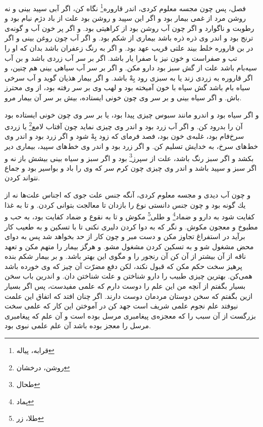 فصل، پس چون مجسه معلوم كردى، اندر قاروره\footnote{قرابه، پیاله} نگاه كن، اگر آبى سپيد بينى و نه روشن مرد از غمى بيمار بود و اگر اين سپيد و روشن بود علت از باد دژم نبام بود و رطوبت و ناگوارد و اگر چون آب روشن بود از كراهيتى بود. و اگر پر خون آب و گونه‌ی ترنج بود و اندر وى ذره ذره باشد بيمارى از شكم بود. و اگر آب چون روغن بينى و اگر در بن قاروره خلط بيند علتى قريب عهد بود. و اگر به رنگ زعفران باشد بدان كه او را تب و صفراست و خون نيز با صفرا يار باشد. اگر بر سر آب زردى باشد و بن آب سيه‌بام باشد علت از گش سبز بود دارو مكن. و اگر بر سر آب سياهى بينى هم چنين، و اگر قاروره به زردى زند يا به سبزى رود بِهْ باشد. و اگر بيمار هذيان گويد و آب سرخى سياه بام باشد گش سپاه با خون آميخته بود و لهب وى بر سر رفته بود، از وى محترز باش. و اگر سياه بينى و بر سر وى چون خونى ايستاده، بيش بر سر آن بيمار مرو.

و اگر سياه بود و اندرو مانند سبوس چيزى پيدا بود، يا بر سر وى چون خونى ايستاده بود آن را بدرود كن. و اگر آب زرد بود و اندر وى چيزى نمايد چون آفتاب لامع\footnote{روشن، درخشان} يا زردى سرخ‌فام بود، غلبه‌ی خون بود، فصد فرماى كه زود بِهْ شود و اگر زرد بود و اندر وى خط‌هاى سرخ، به خدايش تسليم كن. و اگر زرد بود و اندر وى خط‌هاى سپيد، بيمارى دير بكشد و اگر سبز رنگ باشد، علت از سپرز\footnote{طحال} بود و اگر سبز و سياه بينى بيشش باز نه و اگر سبز و سپيد باشد و اندر وى چيزى چون كرم سر كه وى را باد و بواسير بود و جماع نتواند كردن.

و چون آب ديدى و مجسه معلوم كردى، آنگه جنس علت جوى كه اجناس علت‌ها نه از يك گونه بود و چون جنس دانستى نوع را بازدان تا معالجت بتوانى كردن. و تا به غذا كفايت شود به دارو و ضماد\footnote{پماد} و طلى\footnote{طلا، زر} مكوش و تا به نقوع و ضماد كفايت بود، به حب و مطبوخ و معجون مكوش. و نگر كه به دوا كردن دليرى نكنى تا با تسكين و به طعيب كار برآيد در استفراغ تجاوز مكن و دست مبر و چون كار از حد بخواهد شد پس به دواى محض مشغول شو و به تسكين كردن مشغول مشو. و هرگز بيمار را متهم مكن و تعهد ناقه از آن بيشتر از آن كن آن رنجور را و مگوى اين بهتر باشد. و بر بيمار شكم بنده پرهيز سخت حكم مكن كه قبول نكند، لكن دفع مضرّت آن چيز كه وى خورده باشد همى‌كن. بهترين چيزى طبيب را دارو شناختن و علت شناختن دان. و اندرين باب سخن بسيار بگفتم از آنچه من اين علم را دوست دارم كه علمى مفيدست، پس اگر بسيار ازين بگفتم كه سخن دوستان مردمان دوست دارند. اگر چنان افتد كه اتفاق اين علمت نيوفتد علم نجوم علمى شريف است جهد كن در آموختن اين كار كه علمى سخت بزرگست از آن سبب را كه معجزه‌ی پيغامبرى مرسل بوده است و آن علم كه پيغامبرى مرسل را معجز بوده باشد آن علم علمى نبوى بود.

\newpage
